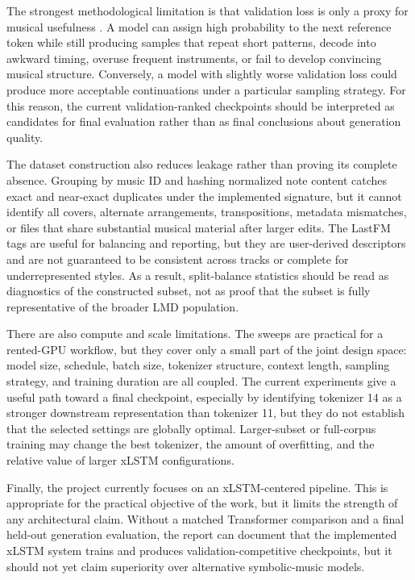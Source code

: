 The strongest methodological limitation is that validation loss is only a proxy
for musical usefulness \citep{dongMuseGANMultitrackSequential2017,ensMMMExploringConditional2020}. A model can assign high probability to the next reference
token while still producing samples that repeat short patterns, decode into
awkward timing, overuse frequent instruments, or fail to develop convincing
musical structure. Conversely, a model with slightly worse validation loss could
produce more acceptable continuations under a particular sampling strategy. For
this reason, the current validation-ranked checkpoints should be interpreted as
candidates for final evaluation rather than as final conclusions about generation
quality.

The dataset construction also reduces leakage rather than proving its complete
absence. Grouping by music ID and hashing normalized note content catches exact
and near-exact duplicates under the implemented signature, but it cannot identify
all covers, alternate arrangements, transpositions, metadata mismatches, or files
that share substantial musical material after larger edits. The LastFM tags are
useful for balancing and reporting, but they are user-derived descriptors and are
not guaranteed to be consistent across tracks or complete for underrepresented
styles. As a result, split-balance statistics should be read as diagnostics of
the constructed subset, not as proof that the subset is fully representative of
the broader LMD population.

There are also compute and scale limitations. The sweeps are practical for a
rented-GPU workflow, but they cover only a small part of the joint design space:
model size, schedule, batch size, tokenizer structure, context length, sampling
strategy, and training duration are all coupled. The current experiments give a
useful path toward a final checkpoint, especially by identifying tokenizer 14 as
a stronger downstream representation than tokenizer 11, but they do not establish
that the selected settings are globally optimal. Larger-subset or full-corpus
training may change the best tokenizer, the amount of overfitting, and the
relative value of larger xLSTM configurations.

Finally, the project currently focuses on an xLSTM-centered pipeline. This is
appropriate for the practical objective of the work, but it limits the strength
of any architectural claim. Without a matched Transformer comparison and a final
held-out generation evaluation, the report can document that the implemented
xLSTM system trains and produces validation-competitive checkpoints, but it
should not yet claim superiority over alternative symbolic-music models.
